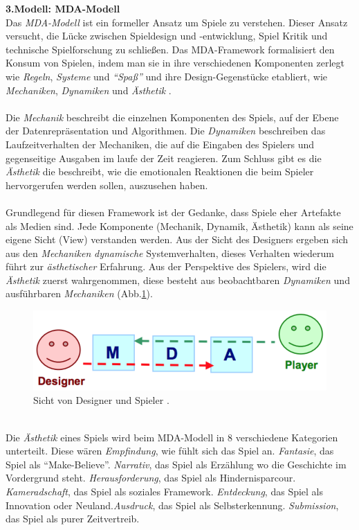 \documentclass[a4paper,12pt]{scrartcl}
\begin{document}
\textbf{3.Modell: MDA-Modell}\\
Das \textit{MDA-Modell} ist ein formeller Ansatz um Spiele zu verstehen. Dieser Ansatz versucht, die Lücke zwischen Spieldesign und -entwicklung, Spiel Kritik und technische Spielforschung zu schließen. Das MDA-Framework formalisiert den Konsum von Spielen, indem man sie in ihre verschiedenen Komponenten zerlegt wie \textit{Regeln}, \textit{Systeme} und \textit{\enquote{Spaß}} und ihre Design-Gegenstücke etabliert, wie \textit{Mechaniken}, \textit{Dynamiken} und \textit{Ästhetik} \cite{Hunicke2004}.
\\\\
Die \textit{Mechanik} beschreibt die einzelnen Komponenten des Spiels, auf der Ebene der Datenrepräsentation und Algorithmen. Die \textit{Dynamiken} beschreiben das Laufzeitverhalten der Mechaniken, die auf die Eingaben des Spielers und gegenseitige Ausgaben im laufe der Zeit reagieren. Zum Schluss gibt es die \textit{Ästhetik} die beschreibt, wie die emotionalen Reaktionen die beim Spieler hervorgerufen werden sollen, auszusehen haben.
\\\\
Grundlegend für diesen Framework ist der Gedanke, dass Spiele eher Artefakte als Medien sind. Jede Komponente (Mechanik, Dynamik, Ästhetik) kann als seine eigene Sicht (View) verstanden werden. Aus der Sicht des Designers ergeben sich aus den \textit{Mechaniken} \textit{dynamische} Systemverhalten, dieses Verhalten wiederum führt zur \textit{ästhetischer} Erfahrung. Aus der Perspektive des Spielers, wird die \textit{Ästhetik} zuerst wahrgenommen, diese besteht aus beobachtbaren \textit{Dynamiken} und ausführbaren \textit{Mechaniken} (Abb.\ref{MDAModelBild}). 
\begin{figure}[h!]
\begin{center}
\includegraphics[scale = 1.0]{Bilder/MDAModel.eps}
\caption{Sicht von Designer und Spieler \cite{Hunicke2004}.}
\label{MDAModelBild}
\end{center}
\end{figure}
\\
Die \textit{Ästhetik} eines Spiels wird beim MDA-Modell in 8 verschiedene Kategorien unterteilt. Diese wären \textit{Empfindung}, wie fühlt sich das Spiel an. \textit{Fantasie}, das Spiel als \enquote{Make-Believe}. \textit{Narrativ}, das Spiel als Erzählung wo die Geschichte im Vordergrund steht. \textit{Herausforderung}, das Spiel als Hindernisparcour. \textit{Kameradschaft}, das Spiel als soziales Framework. \textit{Entdeckung}, das Spiel als Innovation oder Neuland.\textit{Ausdruck}, das Spiel als Selbsterkennung. \textit{Submission}, das Spiel als purer Zeitvertreib.
\end{document}
